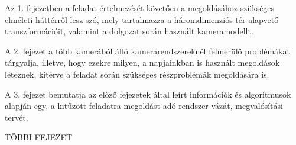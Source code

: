 Az 1. fejezetben a feladat értelmezését követően a megoldásához szükséges elméleti háttérről lesz szó, mely tartalmazza a háromdimenziós tér alapvető transzformációit, valamint a dolgozat során használt kameramodellt.

A 2. fejezet a több kamerából álló kamerarendszereknél felmerülő problémákat tárgyalja, illetve, hogy ezekre milyen, a napjainkban is használt megoldások léteznek, kitérve a feladat során szükséges részproblémák megoldására is.

A 3. fejezet bemutatja az előző fejezetek által leírt információk és algoritmusok alapján egy, a kitűzött feladatra megoldást adó rendszer vázát, megvalósítási tervét. %

{\color{red}  TÖBBI FEJEZET }
